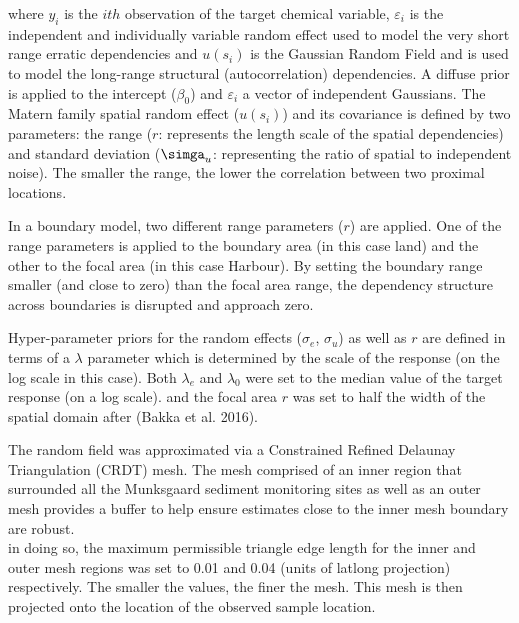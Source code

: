 \documentclass[a4paper]{article}
\begin{document}
where \(y_i\) is the \(ith\) observation of the target chemical
variable, \(\varepsilon_i\) is the independent and individually variable
random effect used to model the very short range erratic dependencies
and \(u(s_i)\) is the Gaussian Random Field and is used to model the
long-range structural (autocorrelation) dependencies. A diffuse prior is
applied to the intercept (\(\beta_0\)) and \(\varepsilon_i\) a vector of
independent Gaussians. The Matern family spatial random effect
(\(u(s_i)\)) and its covariance is defined by two parameters: the range
(\(r\): represents the length scale of the spatial dependencies) and
standard deviation (\(\simga_u\): representing the ratio of spatial to
independent noise). The smaller the range, the lower the correlation
between two proximal locations.

In a boundary model, two different range parameters (\(r\)) are applied.
One of the range parameters is applied to the boundary area (in this
case land) and the other to the focal area (in this case Harbour). By
setting the boundary range smaller (and close to zero) than the focal
area range, the dependency structure across boundaries is disrupted and
approach zero.

Hyper-parameter priors for the random effects (\(\sigma_e\),
\(\sigma_u\)) as well as \(r\) are defined in terms of a \(\lambda\)
parameter which is determined by the scale of the response (on the log
scale in this case). Both \(\lambda_e\) and \(\lambda_0\) were set to
the median value of the target response (on a log scale). and the focal
area \(r\) was set to half the width of the spatial domain after (Bakka
et al. 2016).

The random field was approximated via a Constrained Refined Delaunay
Triangulation (CRDT) mesh. The mesh comprised of an inner region that
surrounded all the Munksgaard sediment monitoring sites as well as an
outer mesh provides a buffer to help ensure estimates close to the inner
mesh boundary are robust.\\
in doing so, the maximum permissible triangle edge length for the inner
and outer mesh regions was set to 0.01 and 0.04 (units of latlong
projection) respectively. The smaller the values, the finer the mesh.
This mesh is then projected onto the location of the observed sample
location.
\end{document}
